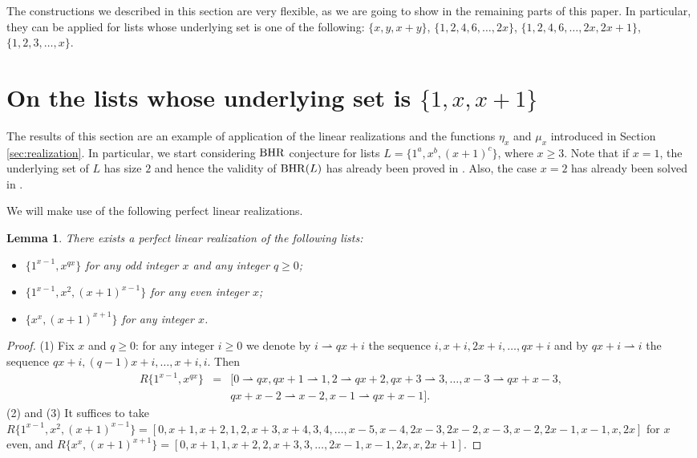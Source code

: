 \documentclass{amsart}
\newtheorem{lem}[prop]{Lemma}
\theoremstyle{definition}
\numberwithin{equation}{section}
\def\BHR{\mathop{\rm BHR}}
\def\su{ \rightharpoonup}
\def\giu{\rightharpoonup}
\begin{document}
The constructions we described in this section are very flexible, as we are going to show in the remaining parts of this paper.
In particular, they can be applied for lists whose underlying set is one of the following:
$\{x,y,x+y\}$,  $\{1,2,4,6,\ldots,2x\}$, $\{1,2,4,6,\ldots,2x, 2x+1\}$, $\{1,2,3,\ldots,x\}$.


\section{On the lists whose underlying set is $\{1,x,x+1\}$}\label{sec:xodd}

The results of this section are an example of application of the linear realizations and the functions
$\eta_x$ and  $\mu_x$ introduced in Section \ref{sec:realization}.
In particular, we start considering $\BHR$ conjecture for lists $L=\{1^a,x^b,(x+1)^c\}$, where $x\geq 3$.
Note that if $x=1$, the underlying set of $L$ has size $2$ and hence the validity of $\BHR(L)$ has  already been proved in \cite{HR}.
Also, the case $x=2$  has already been solved in \cite{CDF}.

We will make use of the following perfect linear realizations.

\begin{lem}\label{perfette}
There exists a perfect linear realization of the following lists:
\begin{itemize}
\item[(1)] $\{1^{x-1},x^{qx}\}$ for any odd integer $x$ and any integer $q\geq 0$;
\item[(2)] $\{1^{x-1},x^2,(x+1)^{x-1}\}$ for any even integer $x$;
\item[(3)] $\{x^x, (x+1)^{x+1}\}$ for any integer $x$.
\end{itemize}
\end{lem}

\begin{proof}
(1) Fix $x$ and $q\geq 0$: for any integer $i\geq 0$ we denote by $i\su qx+i$ the sequence
$i, x+i, 2x+i,\ldots, qx+i$ and by $qx+i \giu i$ the sequence $qx+i, (q-1)x+i,\ldots, x+i, i$.
Then
$$\begin{array}{rcl}
R\{1^{x-1},x^{qx}\} & =& [0\su qx,qx+1 \giu 1, 2 \su qx+2, qx+3 \giu 3,\ldots, x-3 \su qx+x-3, \\
&&  qx+x-2\giu x-2, x-1\su qx+x-1].
    \end{array}$$
(2) and (3) It suffices to take
$R\{1^{x-1},x^2,(x+1)^{x-1}\}=[0,x+1,x+2, 1,2, x+3,x+4, 3,4,\ldots, x-5,x-4, 2x-3,2x-2,
x-3,x-2, 2x-1,x-1,x,2x ]$ for
$x$ even, and
$R\{x^x, (x+1)^{x+1}\}=[0,x+1,1, x+2,2, x+3,3, \ldots, 2x-1, x-1, 2x, x, 2x+1 ]$.
\end{proof}
\end{document}

